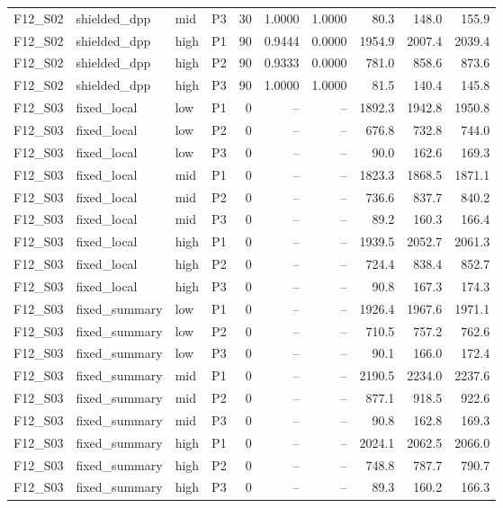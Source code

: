 \begin{longtable}{llllrrrrrr}
F12\_S02 & shielded\_dpp & mid & P3 & 30 & 1.0000 & 1.0000 & 80.3 & 148.0 & 155.9 \\
F12\_S02 & shielded\_dpp & high & P1 & 90 & 0.9444 & 0.0000 & 1954.9 & 2007.4 & 2039.4 \\
F12\_S02 & shielded\_dpp & high & P2 & 90 & 0.9333 & 0.0000 & 781.0 & 858.6 & 873.6 \\
F12\_S02 & shielded\_dpp & high & P3 & 90 & 1.0000 & 1.0000 & 81.5 & 140.4 & 145.8 \\
F12\_S03 & fixed\_local & low & P1 & 0 & -- & -- & 1892.3 & 1942.8 & 1950.8 \\
F12\_S03 & fixed\_local & low & P2 & 0 & -- & -- & 676.8 & 732.8 & 744.0 \\
F12\_S03 & fixed\_local & low & P3 & 0 & -- & -- & 90.0 & 162.6 & 169.3 \\
F12\_S03 & fixed\_local & mid & P1 & 0 & -- & -- & 1823.3 & 1868.5 & 1871.1 \\
F12\_S03 & fixed\_local & mid & P2 & 0 & -- & -- & 736.6 & 837.7 & 840.2 \\
F12\_S03 & fixed\_local & mid & P3 & 0 & -- & -- & 89.2 & 160.3 & 166.4 \\
F12\_S03 & fixed\_local & high & P1 & 0 & -- & -- & 1939.5 & 2052.7 & 2061.3 \\
F12\_S03 & fixed\_local & high & P2 & 0 & -- & -- & 724.4 & 838.4 & 852.7 \\
F12\_S03 & fixed\_local & high & P3 & 0 & -- & -- & 90.8 & 167.3 & 174.3 \\
F12\_S03 & fixed\_summary & low & P1 & 0 & -- & -- & 1926.4 & 1967.6 & 1971.1 \\
F12\_S03 & fixed\_summary & low & P2 & 0 & -- & -- & 710.5 & 757.2 & 762.6 \\
F12\_S03 & fixed\_summary & low & P3 & 0 & -- & -- & 90.1 & 166.0 & 172.4 \\
F12\_S03 & fixed\_summary & mid & P1 & 0 & -- & -- & 2190.5 & 2234.0 & 2237.6 \\
F12\_S03 & fixed\_summary & mid & P2 & 0 & -- & -- & 877.1 & 918.5 & 922.6 \\
F12\_S03 & fixed\_summary & mid & P3 & 0 & -- & -- & 90.8 & 162.8 & 169.3 \\
F12\_S03 & fixed\_summary & high & P1 & 0 & -- & -- & 2024.1 & 2062.5 & 2066.0 \\
F12\_S03 & fixed\_summary & high & P2 & 0 & -- & -- & 748.8 & 787.7 & 790.7 \\
F12\_S03 & fixed\_summary & high & P3 & 0 & -- & -- & 89.3 & 160.2 & 166.3 \\

\end{longtable}
